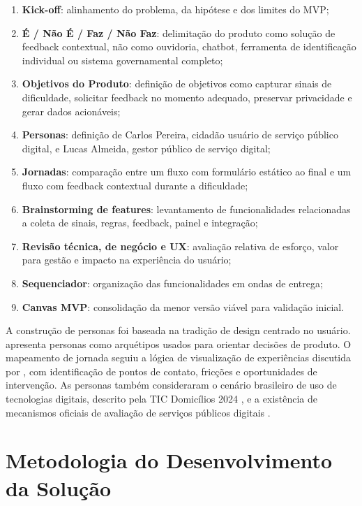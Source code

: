 \begin{enumerate}
    \item \textbf{Kick-off}: alinhamento do problema, da hipótese e dos limites do
    MVP;
    \item \textbf{É / Não É / Faz / Não Faz}: delimitação do produto como solução
    de feedback contextual, não como ouvidoria, chatbot, ferramenta de
    identificação individual ou sistema governamental completo;
    \item \textbf{Objetivos do Produto}: definição de objetivos como capturar
    sinais de dificuldade, solicitar feedback no momento adequado, preservar
    privacidade e gerar dados acionáveis;
    \item \textbf{Personas}: definição de Carlos Pereira, cidadão usuário de
    serviço público digital, e Lucas Almeida, gestor público de serviço digital;
    \item \textbf{Jornadas}: comparação entre um fluxo com formulário estático ao
    final e um fluxo com feedback contextual durante a dificuldade;
    \item \textbf{Brainstorming de features}: levantamento de funcionalidades
    relacionadas a coleta de sinais, regras, feedback, painel e integração;
    \item \textbf{Revisão técnica, de negócio e UX}: avaliação relativa de
    esforço, valor para gestão e impacto na experiência do usuário;
    \item \textbf{Sequenciador}: organização das funcionalidades em ondas de
    entrega;
    \item \textbf{Canvas MVP}: consolidação da menor versão viável para validação
    inicial.
\end{enumerate}

A construção de personas foi baseada na tradição de design centrado no usuário.
 apresenta personas como arquétipos usados para
orientar decisões de produto. O mapeamento de jornada seguiu a lógica de
visualização de experiências discutida por , com
identificação de pontos de contato, fricções e oportunidades de intervenção.
As personas também consideraram o cenário brasileiro de uso de tecnologias
digitais, descrito pela TIC Domicílios 2024 \cite{cetic2025ticDomicilios2024}, e
a existência de mecanismos oficiais de avaliação de serviços públicos digitais
\cite{govbrFerramentaAvaliacao}.

\section{Metodologia do Desenvolvimento da Solução}

